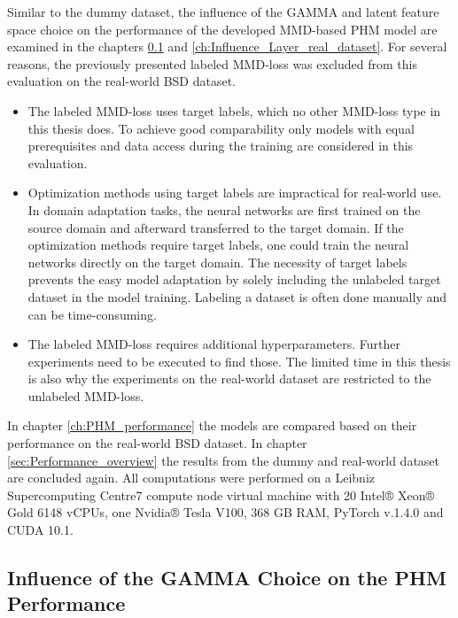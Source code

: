 Similar to the dummy dataset, the influence of the GAMMA and latent feature space choice on the performance of the developed MMD-based PHM model are examined in the chapters \ref{ch:Influence_GAMMA_real_dataset} and \ref{ch:Influence_Layer_real_dataset}. For several reasons, the previously presented labeled MMD-loss was excluded from this evaluation on the real-world BSD dataset. 
\begin{itemize}
    \item The labeled MMD-loss uses target labels, which no other MMD-loss type in this thesis does. To achieve good comparability only models with equal prerequisites and data access during the training are considered in this evaluation.
    \item Optimization methods using target labels are impractical for real-world use. In domain adaptation tasks, the neural networks are first trained on the source domain and afterward transferred to the target domain. If the optimization methods require target labels, one could train the neural networks directly on the target domain. The necessity of target labels prevents the easy model adaptation by solely including the unlabeled target dataset in the model training. Labeling a dataset is often done manually and can be time-consuming.
    \item The labeled MMD-loss requires additional hyperparameters. Further experiments need to be executed to find those. The limited time in this thesis is also why the experiments on the real-world dataset are restricted to the unlabeled MMD-loss. 
\end{itemize}

In chapter \ref{ch:PHM_performance} the models are compared based on their performance on the real-world BSD dataset. In chapter \ref{sec:Performance_overview} the results from the dummy and real-world dataset are concluded again. All computations were performed on a Leibniz Supercomputing Centre7 compute node virtual machine with 20 Intel® Xeon® Gold 6148 vCPUs, one Nvidia® Tesla V100, 368 GB RAM, PyTorch v.1.4.0 and CUDA 10.1.


\subsection{Influence of the GAMMA Choice on the PHM Performance}\label{ch:Influence_GAMMA_real_dataset}

